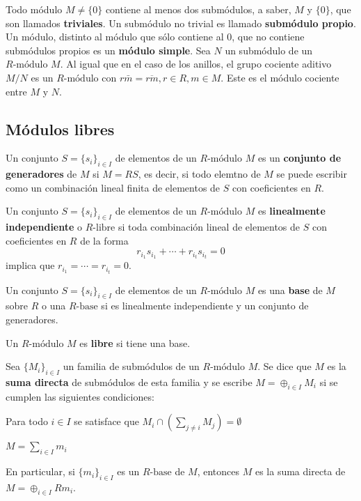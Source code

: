 Todo módulo $M \neq \{0\}$ contiene al menos dos submódulos, a saber, $M$ y $\{0\}$, que son llamados \textbf{triviales}. Un submódulo no trivial es llamado \textbf{submódulo propio}. Un módulo, distinto al módulo que sólo contiene al $0$, que no contiene submódulos propios es un  \textbf{módulo simple}. 
Sea $N$ un submódulo de un $R\mbox{-módulo}$ $M$. Al igual que en el caso de los anillos, el grupo cociente aditivo $M/N$ es un $R\mbox{-módulo}$ con $r\bar{m} = \overline{rm}, r\in R, m \in M$. Este es el módulo cociente entre $M$ y $N$. 

\subsection{Módulos libres}
\begin{definicion}
Un conjunto $S = \{ s_i\}_{i \in I}$ de elementos de un $R\mbox{-módulo}$ $M$ es un \textbf{conjunto de generadores} de $M$ si $M = RS$, es decir, si todo elemtno de $M$ se puede escribir como un combinación lineal finita de elementos de $S$ con coeficientes en $R$.
\end{definicion}
\begin{definicion}
Un conjunto $S = \{ s_i\}_{i \in I}$ de elementos de un $R\mbox{-módulo}$ $M$ es  \textbf{linealmente independiente} o $R\mbox{-libre}$ si toda combinación lineal de elementos de $S$ con coeficientes en $R$ de la forma \[ r_{i_1}s_{i_1} + \cdots + r_{i_t}s_{i_t} = 0   \] implica que $r_{i_1} = \cdots = r_{i_t} = 0$. 
\end{definicion}
\begin{definicion}
Un conjunto $S = \{ s_i\}_{i \in I}$ de elementos de un $R\mbox{-módulo}$ $M$ es una \textbf{base} de $M$ sobre $R$ o una \textbf{$R\mbox{-base}$} si es linealmente independiente y un conjunto de generadores. 
\end{definicion}
\begin{definicion}
Un $R\mbox{-módulo}$ $M$ es \textbf{libre} si tiene una base.
\end{definicion}
\begin{definicion}
Sea $\{M_i\}_{i \in I}$ un familia de submódulos de un $R\mbox{-módulo}$ $M$. Se dice que $M$ es la \textbf{suma directa} de submódulos de esta familia y se escribe $M = \oplus_{i \in I}M_i$ si se cumplen las siguientes condiciones:
\begin{bulletList}
\item Para todo $i \in I$ se satisface que $M_i \cap \left( \sum_{j \neq i} M_j \right) = \emptyset$
\item $M = \sum_{i \in I}m_i$
\end{bulletList}
En particular, si $\{ m_i \}_{i \in I}$ es un $R\mbox{-base}$ de $M$, entonces $M$ es la suma directa de $M = \oplus_{i \in I}Rm_i$.
\end{definicion}
